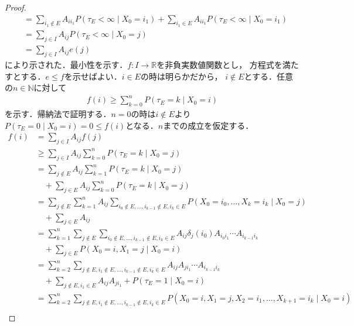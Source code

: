 \documentclass[dvipdfmx,autodetect-engine]{jsarticle}
\theoremstyle{remark}
\theoremstyle{definition}
\newcommand{\R}{\mathbb{R}}
\newcommand{\N}{\mathbb{N}}
\begin{document}
\begin{proof}
\begin{align}
        &= \sum_{i_{1} \notin E} A_{i i_{1}} P(\tau_{E} < \infty \mid X_0 = i_{1})
        + \sum_{i_{1} \in E} A_{i i_{1}} P(\tau_{E} <\infty \mid X_0 = i_{1})\\
        &= \sum_{j \in I} A_{i j} P(\tau_{E} < \infty \mid X_0 = j)\\
        &= \sum_{j \in I} A_{ij} e(j)
    \end{align}
    により示された．最小性を示す．$f \colon I \to \R$を非負実数値関数とし，
    方程式を満たすとする．$e \leq f$を示せばよい．$i \in E$の時は明らかだから，
    $i \notin E$とする．任意の$n \in \N$に対して
    \begin{align}
        f(i) \geq \sum_{k=0}^{n} P(\tau_{E} = k \mid X_0 = i)
    \end{align}
    を示す．帰納法で証明する．$n=0$の時は$i \notin E$より
    $P(\tau_{E} =0\mid X_0 = i) = 0\leq f(i)$となる．$n$までの成立を仮定する．
    \begin{align}
        f(i) &= \sum_{j\in I} A_{ij}f(j) \\
            &\geq \sum_{j \in I} A_{ij} \sum_{k=0}^{n} P(\tau_{E} = k \mid X_0 = j) \\
            &= \sum_{j \notin E} A_{ij} \sum_{k=1}^{n} P(\tau_{E} = k \mid X_0 = j)\\
            &\quad + \sum_{j \in E} A_{ij} \sum_{k=0}^{n} P(\tau_{E} = k \mid X_0 = j) \\
            &= \sum_{j \notin E} \sum_{k=1}^{n} A_{ij}
            \sum_{i_0 \notin E,\ldots,i_{k-1} \notin E,i_{k} \in E}
             P(X_0 = i_0,\ldots,X_k = i_k \mid X_0 = j)\\
            &\quad + \sum_{j \in E} A_{ij}  \\
            &= \sum_{k = 1}^{n} \sum_{j \notin E}  
            \sum_{i_0 \notin E,\ldots,i_{k-1} \notin E,i_{k} \in E}
            A_{ij} \delta_{j}(i_0) A_{i_0 i_1} \cdots A_{i_{k-1} i_{k}} \\
            &\quad + \sum_{j \in E} P(X_0 = i,X_1 = j \mid X_0 = i)  \\
            &=\sum_{k = 2}^{n} \sum_{j \notin E,i_1 \notin E,\ldots,i_{k-1} \notin E,i_{k} \in E}
            A_{ij}  A_{j i_1} \cdots A_{i_{k-1} i_{k}} \\
            &\quad + \sum_{j \notin E,i_1 \in E} A_{ij} A_{j i_1}
            + P(\tau_{E}=1\mid X_0 = i)  \\
            &= \sum_{k = 2}^{n} \sum_{j \notin E,i_1 \notin E,\ldots,i_{k-1} \notin E,i_{k} \in E}
            P(X_0=i,X_1=j,X_2=i_1,\ldots,X_{k+1}=i_k \mid X_0 =i) \\

\end{align}
\end{proof}
\end{document}
